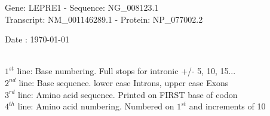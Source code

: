 \documentclass{article}
\begin{document}
\renewcommand{\footrulewidth}{1pt}
\renewcommand{\headrulewidth}{0pt}
\begin{center}
\begin{large}
Gene: LEPRE1 - Sequence: NG\_008123.1\\
Transcript: NM\_001146289.1 - Protein: NP\_077002.2
 
 Date : \today\\\\
\end{large}
\end{center}
$1^{st}$ line: Base numbering. Full stops for intronic +/- 5, 10, 15...\\
$2^{nd}$ line: Base sequence. lower case Introns, upper case Exons\\
$3^{rd}$ line: Amino acid sequence. Printed on FIRST base of codon\\
$4^{th}$ line: Amino acid numbering. Numbered on $1^{st}$ and increments of 10\\
\end{document}
